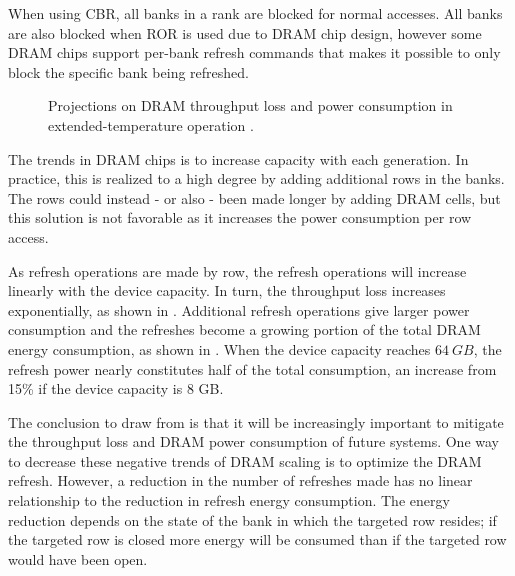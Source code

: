 When using CBR, all banks in a rank are blocked for normal accesses. All banks are also blocked when ROR is used due to DRAM chip design, however some DRAM chips support per-bank refresh commands that makes it possible to only block the specific bank being refreshed. 

\begin{figure}[t]
    \centering
    \caption{Projections on DRAM throughput loss and power consumption in extended-temperature operation \cite{raidr}.}
    \label{fig:dram_data_proj}
\end{figure}

The trends in DRAM chips is to increase capacity with each generation. In practice, this is realized to a high degree by adding additional rows in the banks. The rows could instead - or also - been made longer by adding DRAM cells, but this solution is not favorable as it increases the power consumption per row access. 

As refresh operations are made by row, the refresh operations will increase linearly with the device capacity. In turn, the throughput loss increases exponentially, as shown in . Additional refresh operations give larger power consumption and the refreshes become a growing portion of the total DRAM energy consumption, as shown in . When the device capacity reaches $64\:GB$, the refresh power nearly constitutes half of the total consumption, an increase from 15\% if the device capacity is 8 GB. 

The conclusion to draw from  is that it will be increasingly important to mitigate the throughput loss and DRAM power consumption of future systems. One way to decrease these negative trends of DRAM scaling is to optimize the DRAM refresh. However, a reduction in the number of refreshes made has no linear relationship to the reduction in refresh energy consumption. The energy reduction depends on the state of the bank in which the targeted row resides; if the targeted row is closed more energy will be consumed than if the targeted row would have been open.